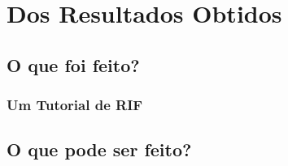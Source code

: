 \chapter{Dos Resultados Obtidos}
\label{cap:results}

\section{O que foi feito?}
\label{sec:to-be-done}

\subsection{Um Tutorial de RIF}
\label{subsec:tutorial}


\section{O que pode ser feito?}
\label{sec:what-can-be-done}

